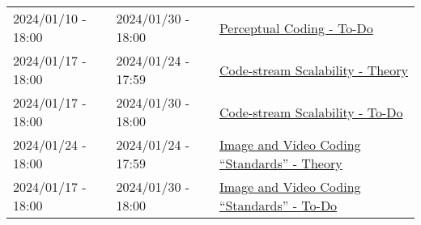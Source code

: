 \begin{tabular}{|l|l|l|}
  2024/01/10 - 18:00 & 2024/01/30 - 18:00 & \href{https://sistemas-multimedia.github.io/contents/perceptual_coding/#x1-100009}{Perceptual Coding - To-Do} \\
  2024/01/17 - 18:00 & 2024/01/24 - 17:59 & \href{https://sistemas-multimedia.github.io/contents/data_scalability/}{Code-stream Scalability - Theory} \\
  2024/01/17 - 18:00 & 2024/01/30 - 18:00 & \href{https://sistemas-multimedia.github.io/contents/data_scalability/#x1-150008}{Code-stream Scalability - To-Do} \\
  2024/01/24 - 18:00 & 2024/01/24 - 17:59 & \href{https://sistemas-multimedia.github.io/contents/standards/}{Image and Video Coding ``Standards'' - Theory} \\
  2024/01/17 - 18:00 & 2024/01/30 - 18:00 & \href{https://sistemas-multimedia.github.io/contents/standards/#x1-40003/}{Image and Video Coding ``Standards'' - To-Do} \\
  \hline
\end{tabular}
 